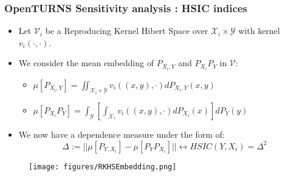 \documentclass{beamer}
\begin{document}
  \begin{frame}
  \frametitle{OpenTURNS Sensitivity analysis : HSIC indices}
  
  \small
  
    \begin{itemize}
    \item Let $\mathcal{V}_i$ be a Reproducing Kernel Hibert Space over $\mathcal{X}_i \times \mathcal{Y} $ with kernel $v_i(\cdot, \cdot)$.
    \item We consider the mean embedding of $P_{X_i,Y}$ and $P_{X_i} P_Y$ in $\mathcal{V}$:
    \begin{itemize}
        \item $\mu [ P_{X_i, Y} ] = \iint_{\mathcal{X}_i \times \mathcal{Y}} v_i((x,y), \cdot) dP_{X_i, Y}(x,y)$
        \item $\mu [ P_{X_i} P_Y ] = \int_{\mathcal{Y}} \left[ \int_{\mathcal{X}_i} v_i((x,y), \cdot) dP_{X_i}(x) \right] dP_Y(y)$
    \end{itemize}
    \item We now have a dependence measure under the form of:
    \begin{equation*}
        \Delta := || \mu [ P_{Y,X_i} ] - \mu [ P_YP_{X_i} ]  || \longleftrightarrow HSIC(Y,X_i) = \Delta^2
    \end{equation*}
    \end{itemize}
  
  \begin{figure}
      \texttt{[image: figures/RKHSEmbedding.png]}
  \end{figure}
  
  \end{frame}
  
  
  
\end{document}
